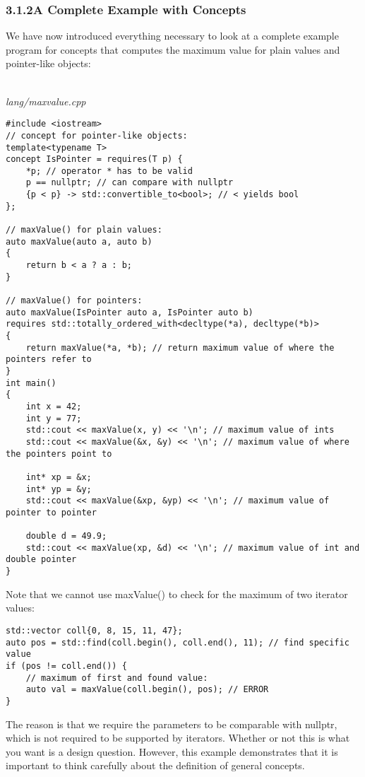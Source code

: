 \subsubsection*{ 3.1.2\hspace{0.2cm}A Complete Example with Concepts}

We have now introduced everything necessary to look at a complete example program for concepts that computes the maximum value for plain values and pointer-like objects:

\noindent
\hspace*{\fill} \\ %
\textit{lang/maxvalue.cpp}

\begin{lstlisting}[style=styleCXX]
#include <iostream>
// concept for pointer-like objects:
template<typename T>
concept IsPointer = requires(T p) {
	*p; // operator * has to be valid
	p == nullptr; // can compare with nullptr
	{p < p} -> std::convertible_to<bool>; // < yields bool
};

// maxValue() for plain values:
auto maxValue(auto a, auto b)
{
	return b < a ? a : b;
}

// maxValue() for pointers:
auto maxValue(IsPointer auto a, IsPointer auto b)
requires std::totally_ordered_with<decltype(*a), decltype(*b)>
{
	return maxValue(*a, *b); // return maximum value of where the pointers refer to
}
int main()
{
	int x = 42;
	int y = 77;
	std::cout << maxValue(x, y) << '\n'; // maximum value of ints
	std::cout << maxValue(&x, &y) << '\n'; // maximum value of where the pointers point to
	
	int* xp = &x;
	int* yp = &y;
	std::cout << maxValue(&xp, &yp) << '\n'; // maximum value of pointer to pointer
	
	double d = 49.9;
	std::cout << maxValue(xp, &d) << '\n'; // maximum value of int and double pointer
}
\end{lstlisting}

Note that we cannot use maxValue() to check for the maximum of two iterator values:

\begin{lstlisting}[style=styleCXX]
std::vector coll{0, 8, 15, 11, 47};
auto pos = std::find(coll.begin(), coll.end(), 11); // find specific value
if (pos != coll.end()) {
	// maximum of first and found value:
	auto val = maxValue(coll.begin(), pos); // ERROR
}
\end{lstlisting}

The reason is that we require the parameters to be comparable with nullptr, which is not required to be supported by iterators. Whether or not this is what you want is a design question. However, this example demonstrates that it is important to think carefully about the definition of general concepts.







